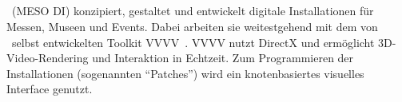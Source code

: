 \subsection{\mesodi}
\label{sec:em_meso_digital_initeriors}

\mesodi~(MESO DI) konzipiert, gestaltet und entwickelt digitale Installationen
für Messen, Museen und Events.  Dabei arbeiten sie weitestgehend mit dem von
\meso~selbst entwickelten Toolkit VVVV~\cite{v4}.  VVVV nutzt DirectX
und ermöglicht 3D-Video-Rendering und Interaktion in Echtzeit.  Zum
Programmieren der Installationen (sogenannten \enquote{Patches}) wird ein
knotenbasiertes visuelles Interface genutzt.
